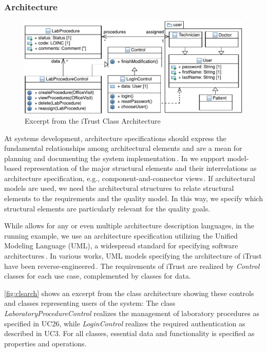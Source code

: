 \subsubsection{Architecture}

\begin{figure}
	\centering
	\includegraphics[width=.75\columnwidth]{figures/itrust-classdiagram-labprocedure.pdf}%
	\caption{Excerpt from the iTrust Class Architecture}%
	\label{fig:clsarch}
\end{figure}

At systems development, architecture specifications should express the fundamental relationships among architectural elements and are a mean for planning and documenting the system implementation\,\cite{CGL+03}.
In \appr{} we support model-based rep\-resentation of the major structural elements and their interrelations as architecture specification, e.g., component-and-connector views\,\cite{Ivers2004DCC,Bertram2017}.
If architectural models are used, we need the architectural structures to relate structural elements to the requirements and the quality model.
In this way, we specify which structural elements are particularly relevant for the quality goals.

While \appr{} allows for any or even multiple architecture description languages, in the running example, we use an architecture specification utilizing the Unified Modeling Language (UML),
a widespread standard for specifying software architectures\,\cite{uml}.
In various works, UML models specifying the architecture of iTrust have been reverse-engineered\,\cite{MOHA2010,BSGRJS2018,PBKJ2021}.
%
The requirements of iTrust are realized by \emph{Control} classes for each use case, complemented by classes for data.

\autoref{fig:clsarch} shows an excerpt from the class architecture showing these controls and classes representing users of the system:
%
The class \textit{LaboratoryProcedureControl} realizes the management of laboratory procedures as specified in UC26, while \textit{LoginControl} realizes the required authentication as described in UC3. For all classes, essential data and functionality is specified as properties and operations. %

